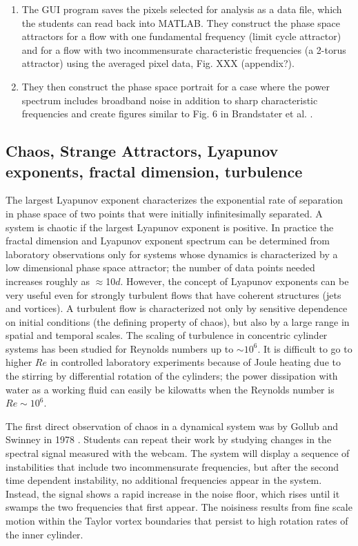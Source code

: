 \documentclass[%
 amsmath,amssymb,
 aps,
floatfix,
aps,prd,longbibliography,
notitlepage
]{revtex4-1}
\begin{document}
\begin{enumerate}
\item The GUI program saves the pixels selected for analysis as a data file, which the students can read back into MATLAB. They construct the phase space attractors for a flow with one fundamental frequency (limit cycle attractor) and for a flow with two incommensurate characteristic frequencies (a 2-torus attractor) using the averaged pixel data, Fig. XXX (appendix?).
\item They then construct the phase space portrait for a case where the power spectrum includes broadband noise in addition to sharp characteristic frequencies and create figures similar to Fig. 6 in Brandstater et al. \cite{brandstater_et_al_1987}.
\end{enumerate}

\subsection{Chaos, Strange Attractors, Lyapunov exponents, fractal dimension, turbulence}

The largest Lyapunov exponent characterizes the exponential rate of separation in phase space of two points that were initially infinitesimally separated.  A system is chaotic if the largest Lyapunov exponent is positive.  In practice the fractal dimension and Lyapunov exponent spectrum can be determined from laboratory observations only for systems whose dynamics is characterized by a low dimensional phase space attractor; the number of data points needed increases roughly as $\approx$10$d$.  However, the concept of Lyapunov exponents can be very useful even for strongly turbulent flows that have coherent structures (jets and vortices). A turbulent flow is characterized not only by sensitive dependence on initial conditions (the defining property of chaos), but also by a large range in spatial and temporal scales. The scaling of turbulence in concentric cylinder systems has been studied for Reynolds numbers up to $\sim10^6$.   It is difficult to go to higher $Re$ in controlled laboratory experiments because of Joule heating due to the stirring by differential rotation of the cylinders; the power dissipation with water as a working fluid can easily be kilowatts when the Reynolds number is $Re\sim10^6$.

The first direct observation of chaos in a dynamical system was by Gollub and Swinney in 1978 \cite{gollub_swinney}. Students can repeat their work by studying changes in the spectral signal measured with the webcam. The system will display a sequence of instabilities that include two incommensurate frequencies, but after the second time dependent instability, no additional frequencies appear in the system. Instead, the signal shows a rapid increase in the noise floor, which rises until it swamps the two frequencies that first appear. The noisiness results from fine scale motion within the Taylor vortex boundaries that persist to high rotation rates of the inner cylinder.
\end{document}
